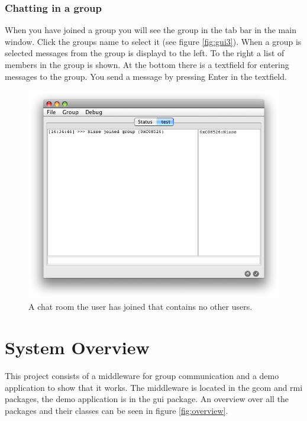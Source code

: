 \documentclass[a4paper,english]{article}
\begin{document}
\subsubsection{Chatting in a group}
When you have joined a group you will see the group in the tab bar in the main window. Click the groups name to select it (see figure \vref{fig:gui3}). When a group is selected messages from the group is displayd to the left. To the right a list of members in the group is shown. At the bottom there is a textfield for entering messages to the group. You send a message by pressing Enter in the textfield.

\begin{figure}
\includegraphics[width=\textwidth]{gui3.png}
\caption{A chat room the user has joined that contains no other users.}
\label{fig:gui3}
\end{figure}


\section{System Overview}

This project consists of a middleware for group communication and a demo application to show that it works. The middleware is located in the gcom and rmi packages, the demo application is in the gui package. An overview over all the packages and their classes can be seen in figure \vref{fig:overview}.
\end{document}
